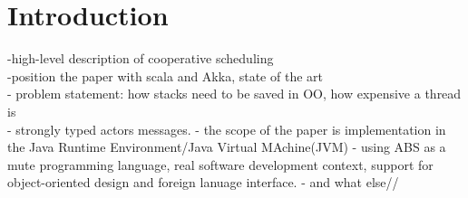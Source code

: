 \section{Introduction}

-high-level description of cooperative scheduling\\
-position the paper with scala and Akka, state of the art\\
- problem statement: how stacks need to be saved in OO, how expensive a thread is\\
- strongly typed actors messages.
- the scope of the paper is implementation in the Java Runtime Environment/Java Virtual MAchine(JVM)
- using ABS as a mute programming language, real software development context, support for object-oriented design and foreign lanuage interface.
- and what else//